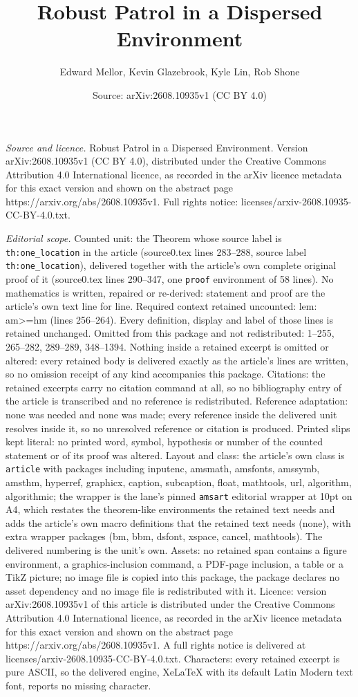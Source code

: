 \documentclass[10pt,a4paper]{amsart}
\title[Robust Patrol in a Dispersed Environment]{Robust Patrol in a Dispersed Environment}
\author{Edward Mellor, Kevin Glazebrook, Kyle Lin, Rob Shone}
\date{Source: arXiv:2608.10935v1 (CC BY 4.0)}
\begin{document}
\maketitle

\noindent\emph{Source and licence.} Robust Patrol in a Dispersed Environment. Version arXiv:2608.10935v1 (CC BY 4.0), distributed under the Creative Commons Attribution 4.0 International licence, as recorded in the arXiv licence metadata for this exact version and shown on the abstract page https://arxiv.org/abs/2608.10935v1. Full rights notice: licenses/arxiv-2608.10935-CC-BY-4.0.txt.\par\smallskip

\noindent\textit{Editorial scope.} Counted unit: the Theorem whose source label is \texttt{th:one\_location} in the article (source0.tex lines 283--288, source label \texttt{th:one\_location}), delivered together with the article's own complete original proof of it (source0.tex lines 290--347, one \texttt{proof} environment of 58 lines). No mathematics is written, repaired or re-derived: statement and proof are the article's own text line for line. Required context retained uncounted: lem: am>=hm (lines 256--264). Every definition, display and label of those lines is retained unchanged. Omitted from this package and not redistributed: 1--255, 265--282, 289--289, 348--1394. Nothing inside a retained excerpt is omitted or altered: every retained body is delivered exactly as the article's lines are written, so no omission receipt of any kind accompanies this package. Citations: the retained excerpts carry no citation command at all, so no bibliography entry of the article is transcribed and no reference is redistributed. Reference adaptation: none was needed and none was made; every reference inside the delivered unit resolves inside it, so no unresolved reference or citation is produced. Printed slips kept literal: no printed word, symbol, hypothesis or number of the counted statement or of its proof was altered. Layout and class: the article's own class is \texttt{article} with packages including inputenc, amsmath, amsfonts, amssymb, amsthm, hyperref, graphicx, caption, subcaption, float, mathtools, url, algorithm, algorithmic; the wrapper is the lane's pinned \texttt{amsart} editorial wrapper at 10pt on A4, which restates the theorem-like environments the retained text needs and adds the article's own macro definitions that the retained text needs (none), with extra wrapper packages (bm, bbm, dsfont, xspace, cancel, mathtools). The delivered numbering is the unit's own. Assets: no retained span contains a figure environment, a graphics-inclusion command, a PDF-page inclusion, a table or a TikZ picture; no image file is copied into this package, the package declares no asset dependency and no image file is redistributed with it. Licence: version arXiv:2608.10935v1 of this article is distributed under the Creative Commons Attribution 4.0 International licence, as recorded in the arXiv licence metadata for this exact version and shown on the abstract page https://arxiv.org/abs/2608.10935v1. A full rights notice is delivered at licenses/arxiv-2608.10935-CC-BY-4.0.txt. Characters: every retained excerpt is pure ASCII, so the delivered engine, XeLaTeX with its default Latin Modern text font, reports no missing character.
\end{document}
